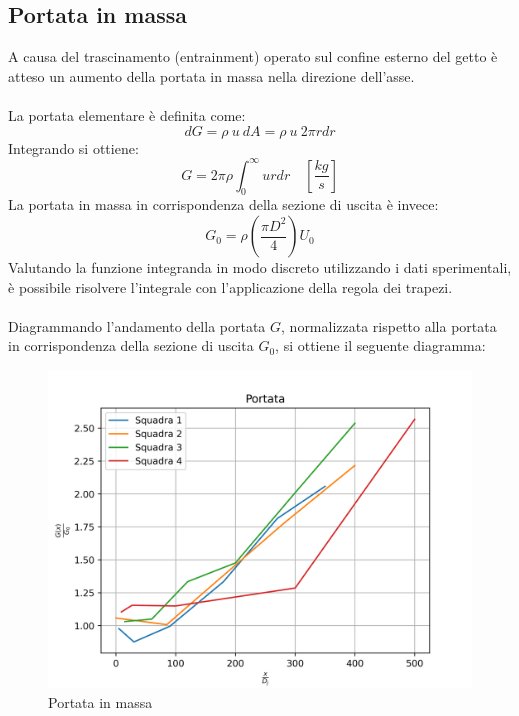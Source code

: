 \subsection{Portata in massa}
A causa del trascinamento (entrainment) operato sul confine esterno del getto è atteso un aumento della portata in massa nella direzione dell'asse.\\\\
La portata elementare è definita come:
\begin{equation*}
    dG = \rho\ u\ dA = \rho\ u\ 2\pi rdr
\end{equation*}
Integrando si ottiene:
\begin{equation*}
    G = 2\pi\rho \int_0^\infty ur dr \quad \left[\frac{kg}{s} \right]
\end{equation*}
La portata in massa in corrispondenza della sezione di uscita è invece:
\begin{equation*}
    G_0 = \rho \left( \frac{\pi D^2}4 \right) U_0
\end{equation*}
Valutando la funzione integranda in modo discreto utilizzando i dati sperimentali, è possibile risolvere l'integrale con l'applicazione della regola dei trapezi.\\\\
Diagrammando l'andamento della portata $G$, normalizzata rispetto alla portata in corrispondenza della sezione di uscita $G_0$, si ottiene il seguente diagramma:
\begin{figure}[h]
    \centering
    \includegraphics[width=.8\linewidth]{images/4/portata.png}
    \caption{Portata in massa}
\end{figure}

